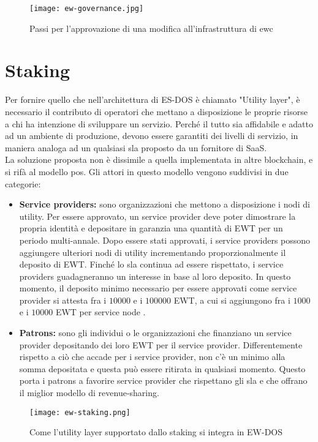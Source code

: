 \begin{figure}[h]
    \texttt{[image: ew-governance.jpg]}
    \centering
    \caption{Passi per l'approvazione di una modifica all'infrastruttura di \gls{ewc} \cite{img:ew-governance}}
    \label{lab:ew-governance}
\end{figure}


\section{Staking}
\label{sec:staking}
Per fornire quello che nell'architettura di ES-DOS è chiamato "Utility layer", è necessario il contributo di operatori che mettano a disposizione le proprie risorse a chi ha intenzione di sviluppare un servizio.
Perché il tutto sia affidabile e adatto ad un ambiente di produzione, devono essere garantiti dei livelli di servizio, in maniera analoga ad un qualsiasi \gls{sla} proposto da un fornitore di SaaS. \\
La soluzione proposta non è dissimile a quella implementata in altre blockchain, e si rifà al modello \gls{pos}.
Gli attori in questo modello vengono suddivisi in due categorie:

\begin{itemize}
    \item \textbf{Service providers:} sono organizzazioni che mettono a disposizione i nodi di utility.
          Per essere approvato, un service provider deve poter dimostrare la propria identità e depositare in garanzia una quantità di EWT per un periodo multi-annale.
          Dopo essere stati approvati, i service providers possono aggiungere ulteriori nodi di utility incrementando proporzionalmente il deposito di EWT.
          Finché lo \gls{sla} continua ad essere rispettato, i service providers guadagneranno un interesse in base al loro deposito.
          In questo momento, il deposito minimo necessario per essere approvati come service provider si attesta fra i $10000$ e i $100000$ EWT, a cui si aggiungono fra i $1000$ e i $10000$ EWT per service node \cite{art:ew-staking}.
    \item \textbf{Patrons:} sono gli individui o le organizzazioni che finanziano un service provider depositando dei loro EWT per il service provider.
          Differentemente rispetto a ciò che accade per i service provider, non c'è un minimo alla somma depositata e questa può essere ritirata in qualsiasi momento.
          Questo porta i patrons a favorire service provider che rispettano gli \gls{sla} e che offrano il miglior modello di revenue-sharing.
\end{itemize}

\begin{figure}[ht]
    \texttt{[image: ew-staking.png]}
    \centering
    \caption{Come l'utility layer supportato dallo staking si integra in EW-DOS \cite{art:ew-staking}}
    \label{lab:ew-staking}
\end{figure}